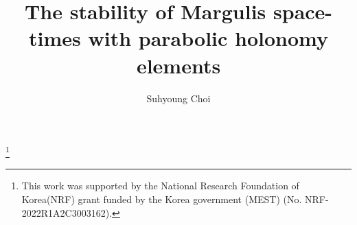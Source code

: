 \documentclass{amsart}
\numberwithin{equation}{section}
\theoremstyle{definition}
\theoremstyle{remark}
\begin{document}
	
	
	
	
	

	



\title[The stability of Margulis space-times]{The stability of Margulis space-times with parabolic holonomy elements}



\author{Suhyoung Choi} 
\address{Department of Mathematical Sciences, KAIST,
		305-701, Daejeon, Republic of Korea}


\thanks{This work was supported by 
the National Research Foundation of Korea(NRF) grant funded by the Korea government 
(MEST) (No. NRF-2022R1A2C3003162).}





%


%
\end{document}
